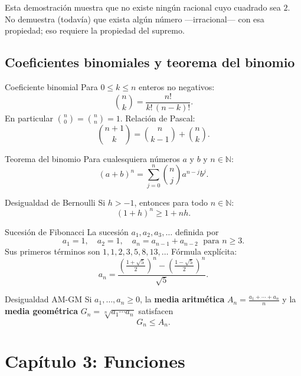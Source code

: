 \documentclass[12pt]{article}
\begin{document}
\begin{nota}[]{}
Esta demostración muestra que no existe ningún racional cuyo cuadrado sea $2$. No demuestra (todavía) que exista algún número —irracional— con esa propiedad; eso requiere la propiedad del supremo.
\end{nota}

\subsection{Coeficientes binomiales y teorema del binomio}

\begin{definicion}[]{Coeficiente binomial}
Para $0 \leq k \leq n$ enteros no negativos:
\[ \binom{n}{k} = \frac{n!}{k!\,(n-k)!}. \]
En particular $\binom{n}{0} = \binom{n}{n} = 1$. Relación de Pascal:
\[ \binom{n+1}{k} = \binom{n}{k-1} + \binom{n}{k}. \]
\end{definicion}

\begin{teorema}[]{Teorema del binomio}
Para cualesquiera números $a$ y $b$ y $n \in \mathbb{N}$:
\[ (a+b)^n = \sum_{j=0}^{n} \binom{n}{j} a^{n-j} b^j. \]
\end{teorema}

\begin{proposicion}[]{Desigualdad de Bernoulli}
Si $h > -1$, entonces para todo $n \in \mathbb{N}$:
\[ (1+h)^n \geq 1 + nh. \]
\end{proposicion}

\begin{definicion}[]{Sucesión de Fibonacci}
La sucesión $a_1, a_2, a_3, \ldots$ definida por
\[ a_1 = 1, \quad a_2 = 1, \quad a_n = a_{n-1} + a_{n-2} \;\text{ para } n \geq 3. \]
Sus primeros términos son $1, 1, 2, 3, 5, 8, 13, \ldots$ Fórmula explícita:
\[ a_n = \frac{\left(\tfrac{1+\sqrt{5}}{2}\right)^n - \left(\tfrac{1-\sqrt{5}}{2}\right)^n}{\sqrt{5}}. \]
\end{definicion}

\begin{proposicion}[]{Desigualdad AM-GM}
Si $a_1, \ldots, a_n \geq 0$, la \textbf{media aritmética} $A_n = \tfrac{a_1+\cdots+a_n}{n}$ y la \textbf{media geométrica} $G_n = \sqrt[n]{a_1 \cdots a_n}$ satisfacen
\[ G_n \leq A_n. \]
\end{proposicion}

\section{Capítulo 3: Funciones}
\end{document}
